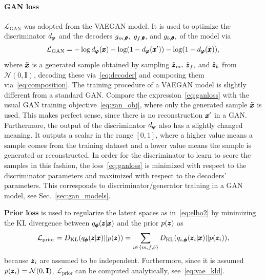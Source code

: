 \paragraph{GAN loss} $\mathcal{L}_{\text{GAN}}$ was adopted from the VAEGAN model. It is used to optimize the discriminator $d_{\pmb{{\varphi}}}$ and the decoders $g_{m,\pmb{{\theta}}},$ $g_{f,\pmb{{\theta}}},$ and $g_{b,\pmb{{\theta}}},$ of the model via
\begin{equation} \label{eq:ganloss}
    \mathcal{L}_{\text{GAN}}  = - \log d_{\pmb{{\varphi}}}(\pmb{{x}}) - \log (1 - d_{\pmb{{\varphi}}}(\pmb{{x}}')) - \log (1-d_{\pmb{{\varphi}}}(\tilde{\pmb{{x}}})),
\end{equation}
where $\tilde{\pmb{{x}}}$ is a generated sample obtained by sampling $\tilde{\pmb{{z}}}_m,$ $\tilde{\pmb{{z}}}_f,$ and $\tilde{\pmb{{z}}}_b$ from $\mathcal{N}(0,\textbf{I})$, decoding these via~\eqref{eq:decoder} and composing them via~\eqref{eq:composition}. The training procedure of a VAEGAN model is slightly different from a standard GAN. Compare the expression~\eqref{eq:ganloss} with the usual GAN training objective~\eqref{eq:gan_obj}, where only the generated sample $\tilde{\pmb{{x}}}$ is used. This makes perfect sense, since there is no reconstruction  $\pmb{{x}}'$ in a GAN. Furthermore, the output of the discriminator $d_{\pmb{{\varphi}}}$ also has a slightly changed meaning. It outputs a scalar in the range $[0,1]$, where a higher value means a sample comes from the training dataset and a lower value means the sample is generated or reconstructed. In order for the discriminator to learn to score the samples in this fashion, the loss~\eqref{eq:ganloss} is minimized with respect to the discriminator parameters and maximized with respect to the decoders' parameters. This corresponds to discriminator/generator training in a GAN model, see Sec.~\ref{sec:gan_models}.

\textbf{Prior loss} is used to regularize the latent spaces as in~\eqref{eq:elbo2} by minimizing the KL divergence between $q_{\pmb{{\phi}}} (\pmb{{z}} \vert \pmb{{x}})$ and the prior $p(\pmb{{z}})$ as
\begin{equation} \label{eq:kldloss}
    \mathcal{L}_{\text{prior}} = D_\text{KL} (q_{\pmb{{\phi}}} (\pmb{{z}} \vert \pmb{{x}}) \vert \vert p(\pmb{{z}})) = \sum_{i \in \lbrace m, f, b \rbrace} D_\text{KL} (q_{i,\pmb{{\phi}}} (\pmb{{z}}_i  \vert \pmb{{x}}) \vert\vert p(\pmb{{z}}_i)),
\end{equation} 
because $\pmb{{z}}_i$ are assumed to be independent. Furthermore, since it is assumed $p(\pmb{{z}}_i) = \mathcal{N}(0,\mathbf{I})$, $\mathcal{L}_{\text{prior}}$ can be computed analytically, see~\eqref{eq:vae_kld}.

